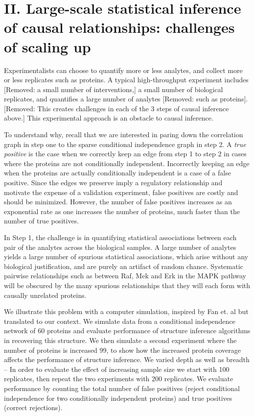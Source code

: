 \documentclass[journal=jacsat,manuscript=article]{achemso}
\def\added#1{{\color{blue} #1}}
\def\removed#1{{\color{magenta}[Removed: #1]}}
\begin{document}
\section{II. Large-scale statistical inference of causal relationships: challenges of scaling up}

\added{Experimentalists can choose to quantify more or less analytes, and collect more or less replicates such as proteins.} A typical high-throughput experiment includes \removed{a small number of interventions,} a small number of biological replicates, and quantifies a large number of analytes \removed{such as proteins}. \removed{This creates challenges in each of the 3 steps of causal inference above.}  \added{This experimental approach is an obstacle to causal inference.}

\added{To understand why, recall that we are interested in paring down the correlation graph in step one to the sparse conditional independence graph in step 2.  A {\it true positive} is the case when we correctly keep an edge from step 1 to step 2 in cases where the proteins are not conditionally independent.  Incorrectly keeping an edge when the proteins are actually conditionally independent is a case of a false positive.  Since the edges we preserve imply a regulatory relationship and motivate the expense of a validation experiment, false positives are costly and should be minimized.  However, the number of false positives increases as an exponential rate as one increases the number of proteins, much faster than the number of true positives.} 

In Step 1, the challenge is in quantifying statistical associations between each pair of the analytes across the biological samples. A large number of analytes yields a large number of spurious statistical associations, which arise without any biological justification, and are purely an artifact of random chance. Systematic pairwise relationships such as between Raf, Mek and Erk in the MAPK pathway will be obscured by the many spurious relationships that they will each form with causally unrelated proteins.

We illustrate this problem with a computer simulation, inspired by Fan et. al \cite{fan2014challenges} but translated to our context.  We simulate data from a conditional independence network of 60 proteins and evaluate performance of structure inference algorithms in recovering this structure.  We then simulate a second experiment where the number of proteins is increased 99, to show how the increased protein coverage affects the performance of structure inference.  We varied depth as well as breadth -- In order to evaluate the effect of increasing sample size we start with 100 replicates, then repeat the two experiments with 200 replicates.  We evaluate performance by counting the total number of false positives (reject conditional independence for two conditionally independent proteins) and true positives (correct rejections). 
\end{document}
